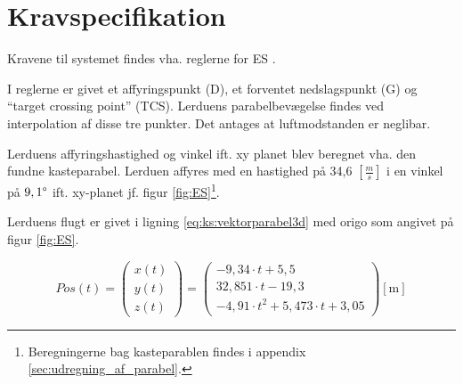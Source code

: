 \section{Kravspecifikation}
\label{sec:kravspecifikation}
Kravene til systemet findes vha. reglerne for ES \citep{ES_regler}.


I reglerne er givet et affyringspunkt (D), et forventet nedslagspunkt (G) og ``target crossing point'' (TCS).
Lerduens parabelbevægelse findes ved interpolation af disse tre punkter. Det antages at luftmodstanden er neglibar.

%
Lerduens affyringshastighed og vinkel ift. xy planet blev beregnet vha. den fundne kasteparabel. 
Lerduen affyres med en hastighed på 34,6 \([\frac{m}{s}]\) i en vinkel på \(9,1\degree\) 
ift. xy-planet jf. figur \ref{fig:ES}\footnote{Beregningerne bag kasteparablen findes i appendix \ref{sec:udregning_af_parabel}.}. 

Lerduens flugt er givet i ligning \ref{eq:ks:vektorparabel3d} med origo som angivet på figur \ref{fig:ES}. 

\begin{equation}
Pos\left( t \right) = 
\left( \begin{matrix} 
	x\left( t \right)  \\ 
	y\left( t \right)  \\ 
	z\left( t \right)  \end{matrix} \right) =
	 \left( \begin{matrix} 
	- 9,34\cdot t+5,5 \\
  32,851\cdot t-19,3 \\ 
 -{ 4,91\cdot t }^{ 2 }+5,473\cdot t+3,05\end{matrix} \right) [\text{m}]
\label{eq:ks:vektorparabel3d}
\end{equation}

